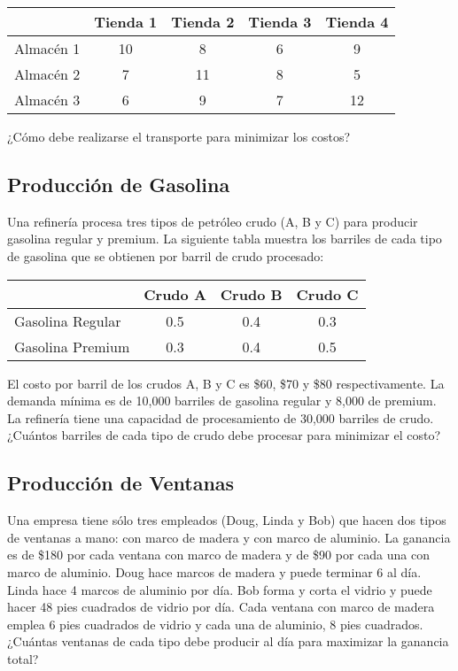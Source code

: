 \documentclass[12pt]{article}
\begin{document}
\begin{center}
\begin{tabular}{lcccc}
\toprule
& Tienda 1 & Tienda 2 & Tienda 3 & Tienda 4 \\
\midrule
Almacén 1 & 10 & 8 & 6 & 9 \\
Almacén 2 & 7 & 11 & 8 & 5 \\
Almacén 3 & 6 & 9 & 7 & 12 \\
\bottomrule
\end{tabular}
\end{center}

¿Cómo debe realizarse el transporte para minimizar los costos?

\subsection{Producción de Gasolina}

Una refinería procesa tres tipos de petróleo crudo (A, B y C) para producir gasolina regular y premium. La siguiente tabla muestra los barriles de cada tipo de gasolina que se obtienen por barril de crudo procesado:

\begin{center}
\begin{tabular}{lccc}
\toprule
& Crudo A & Crudo B & Crudo C \\
\midrule
Gasolina Regular & 0.5 & 0.4 & 0.3 \\
Gasolina Premium & 0.3 & 0.4 & 0.5 \\
\bottomrule
\end{tabular}
\end{center}

El costo por barril de los crudos A, B y C es \$60, \$70 y \$80 respectivamente. La demanda mínima es de 10,000 barriles de gasolina regular y 8,000 de premium. La refinería tiene una capacidad de procesamiento de 30,000 barriles de crudo. ¿Cuántos barriles de cada tipo de crudo debe procesar para minimizar el costo?

\subsection{Producción de Ventanas}

Una empresa tiene sólo tres empleados (Doug, Linda y Bob) que hacen dos tipos de ventanas a mano: con marco de madera y con marco de aluminio. La ganancia es de \$180 por cada ventana con marco de madera y de \$90 por cada una con marco de aluminio. Doug hace marcos de madera y puede terminar 6 al día. Linda hace 4 marcos de aluminio por día. Bob forma y corta el vidrio y puede hacer 48 pies cuadrados de vidrio por día. Cada ventana con marco de madera emplea 6 pies cuadrados de vidrio y cada una de aluminio, 8 pies cuadrados. ¿Cuántas ventanas de cada tipo debe producir al día para maximizar la ganancia total?
\end{document}
